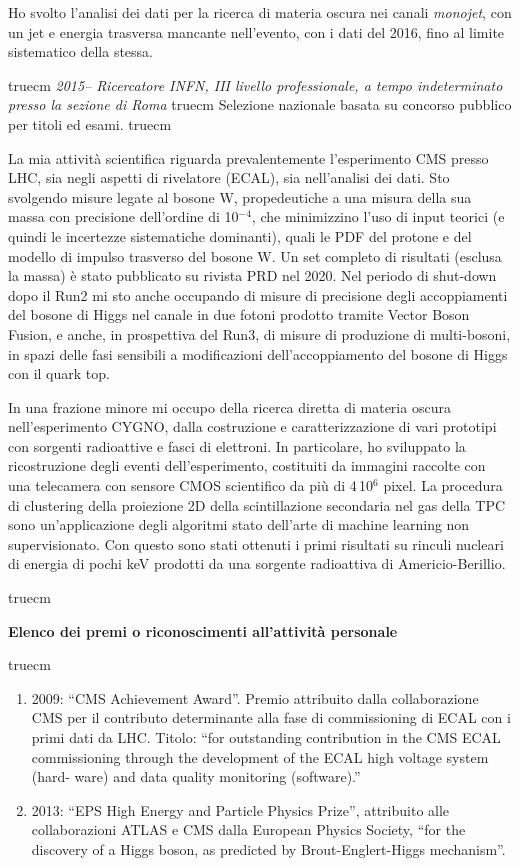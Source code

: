 \documentclass[11pt,twoside,a4paper]{article}
\begin{document}
Ho svolto l'analisi dei dati per la ricerca di materia oscura nei
canali \textit{monojet}, con un jet e energia trasversa mancante
nell'evento, con i dati del 2016, fino al limite sistematico della
stessa.

 truecm
\textit{2015-- Ricercatore INFN, III livello professionale, a tempo indeterminato presso la sezione di Roma}
 truecm
Selezione nazionale basata su concorso pubblico per titoli ed esami.
 truecm

La mia attivit\`a scientifica riguarda prevalentemente l'esperimento
CMS presso LHC, sia negli aspetti di rivelatore (ECAL), sia
nell'analisi dei dati. Sto svolgendo misure legate al bosone W,
propedeutiche a una misura della sua massa con precisione dell'ordine
di 10$^{-4}$, che minimizzino l'uso di input teorici (e quindi le
incertezze sistematiche dominanti), quali le PDF del protone e del
modello di impulso trasverso del bosone W. Un set completo di
risultati (esclusa la massa) \`e stato pubblicato su rivista PRD nel
2020. Nel periodo di shut-down dopo il Run2 mi sto anche occupando di
misure di precisione degli accoppiamenti del bosone di Higgs nel
canale in due fotoni prodotto tramite Vector Boson Fusion, e anche, in
prospettiva del Run3, di misure di produzione di multi-bosoni, in
spazi delle fasi sensibili a modificazioni dell'accoppiamento del
bosone di Higgs con il quark top.

In una frazione minore mi occupo della ricerca diretta di materia
oscura nell'esperimento CYGNO, dalla costruzione e caratterizzazione
di vari prototipi con sorgenti radioattive e fasci di elettroni. In
particolare, ho sviluppato la ricostruzione degli eventi
dell'esperimento, costituiti da immagini raccolte con una telecamera
con sensore CMOS scientifico da pi\`u di 4\,10$^6$ pixel.  La
procedura di clustering della proiezione 2D della scintillazione
secondaria nel gas della TPC sono un'applicazione degli algoritmi
stato dell'arte di machine learning non supervisionato. Con questo
sono stati ottenuti i primi risultati su rinculi nucleari di energia
di pochi keV prodotti da una sorgente radioattiva di Americio-Berillio.


 truecm
\begin{center}
\textbf{Elenco dei premi o riconoscimenti all’attivit\`a personale}
\end{center}
 truecm

\begin{enumerate}
\item 2009: ``CMS Achievement Award''. Premio attribuito dalla
  collaborazione CMS per il contributo determinante alla fase di
  commissioning di ECAL con i primi dati da LHC. Titolo: ``for
  outstanding contribution in the CMS ECAL commissioning through the
  development of the ECAL high voltage system (hard- ware) and data
  quality monitoring (software).''

\item 2013: ``EPS High Energy and Particle Physics Prize'', attribuito
  alle collaborazioni ATLAS e CMS dalla European Physics Society,
  ``for the discovery of a Higgs boson, as predicted by
  Brout-Englert-Higgs mechanism''.
\end{enumerate}
\end{document}
